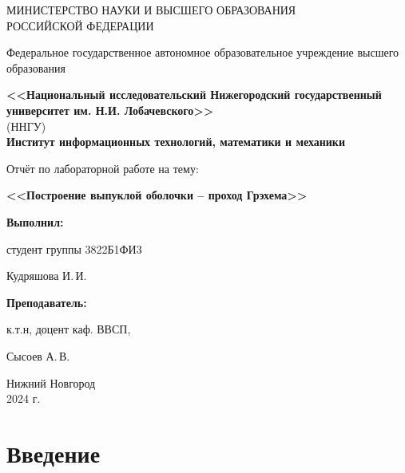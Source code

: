 \documentclass[a4paper,12pt]{article}
\begin{document}
	\begin{titlepage}
	\begin{center}
		\large
		{МИНИСТЕРСТВО НАУКИ И ВЫСШЕГО ОБРАЗОВАНИЯ\\ РОССИЙСКОЙ ФЕДЕРАЦИИ}
		
		Федеральное государственное автономное образовательное учреждение высшего образования
		\vspace{0.5cm}
		
		\textbf{<<Национальный исследовательский Нижегородский государственный университет им. Н.И. Лобачевского>>}\\
		(ННГУ)\\
		\vspace{1cm}
		\textbf{Институт информационных технологий, математики и механики}\\
		\vspace{1cm}
		
		\vfill

		
		\Large
		Отчёт по лабораторной работе на тему:
		
		\textbf{<<Построение выпуклой оболочки – проход Грэхема>>}
		{\LARGE 
		}
		\bigskip
		
		
	\end{center}
	\vfill
	
	
	\vfill
	
	\hfill\begin{minipage}{0.4\textwidth}
		\textbf{Выполнил:} 

            студент группы 3822Б1ФИ3 

            Кудряшова И.\,И. \bigskip
            
	\end{minipage}%
	
	\hfill\begin{minipage}{0.4\textwidth}
		\textbf{Преподаватель:}
		
    к.т.н, доцент каф. ВВСП, 
    
    Сысоев А.\,В.
	\end{minipage}%
	\vfill
	
	\begin{center}
		Нижний Новгород\\
		2024 г.
	\end{center}
\end{titlepage}

\newpage

\section*{Введение}
\end{document}
